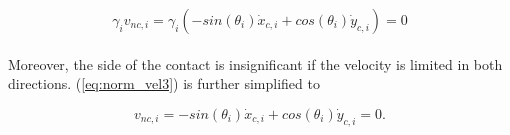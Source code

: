 \begin{equation}\label{eq:norm_vel3}
    \gamma_i v_{nc,i} = \gamma_i(-sin(\theta_i) \dot{x}_{c,i} + cos(\theta_i) \dot{y}_{c,i}) = 0
\end{equation}
\\
Moreover, the side of the contact is insignificant if the velocity is limited in both directions. (\ref{eq:norm_vel3}) is further simplified to

\begin{equation}\label{eq:norm_vel4}
    v_{nc,i} = -sin(\theta_i) \dot{x}_{c,i} + cos(\theta_i) \dot{y}_{c,i} = 0.
\end{equation}
\\